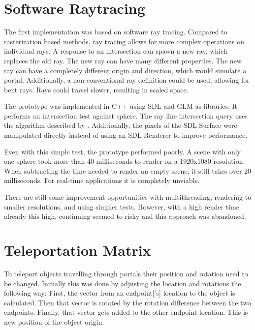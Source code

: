 \section{Software Raytracing}
The first implementation was based on software ray tracing. Compared to rasterization based methods, ray tracing allows for more complex operations on individual rays. A response to an intersection can spawn a new ray, which replaces the old ray. The new ray can have many different properties. The new ray can have a completely different origin and direction, which would simulate a portal. Additionally, a non-conventional ray definition could be used, allowing for bent rays. Rays could travel slower, resulting in scaled space.

The prototype was implemented in C++ using SDL \cite{sdl} and GLM \cite{glm} as libraries. It performs an intersection test against sphere. The ray line intersection query uses the algorithm described by \textcite{eberly:2006:3d}. Additionally, the pixels of the SDL Surface were manipulated directly instead of using an SDL Renderer to improve performance.

Even with this simple test, the prototype performed poorly. A scene with only one sphere took more than 40 milliseconds to render on a 1920x1080 resolution. When subtracting the time needed to render an empty scene, it still takes over 20 milliseconds. For real-time applications it is completely unviable.

There are still some improvement opportunities with multithreading, rendering to smaller resolutions, and using simpler tests. However, with a high render time already this high, continuing seemed to risky and this approach was abandoned.








\section{Teleportation Matrix}
\label{section:teleportationmatrix}
To teleport objects travelling through portals their position and rotation need to be changed. Initially this was done by adjusting the location and rotations the following way: First, the vector from an \gls{endpoint}['s] location to the object is calculated. Then that vector is rotated by the rotation difference between the two endpoints. Finally, that vector gets added to the other endpoint location. This is new position of the object origin.


